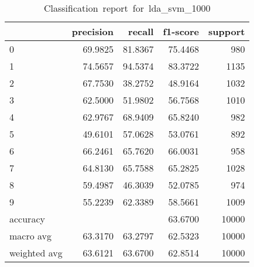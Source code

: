 \begin{table}[htb!]
    \centering
    \begin{tabular}{lrrrr}
        \toprule
                     & precision & recall  & f1-score & support \\
        \midrule
        0            & 69.9825   & 81.8367 & 75.4468  & 980     \\
        1            & 74.5657   & 94.5374 & 83.3722  & 1135    \\
        2            & 67.7530   & 38.2752 & 48.9164  & 1032    \\
        3            & 62.5000   & 51.9802 & 56.7568  & 1010    \\
        4            & 62.9767   & 68.9409 & 65.8240  & 982     \\
        5            & 49.6101   & 57.0628 & 53.0761  & 892     \\
        6            & 66.2461   & 65.7620 & 66.0031  & 958     \\
        7            & 64.8130   & 65.7588 & 65.2825  & 1028    \\
        8            & 59.4987   & 46.3039 & 52.0785  & 974     \\
        9            & 55.2239   & 62.3389 & 58.5661  & 1009    \\
        accuracy     &           &         & 63.6700  & 10000   \\
        macro avg    & 63.3170   & 63.2797 & 62.5323  & 10000   \\
        weighted avg & 63.6121   & 63.6700 & 62.8514  & 10000   \\
        \bottomrule
    \end{tabular}
    \caption{Classification\ report\ for\ lda\_svm\_1000}
    \label{tab:classification-report-lda_svm_1000}
\end{table}

